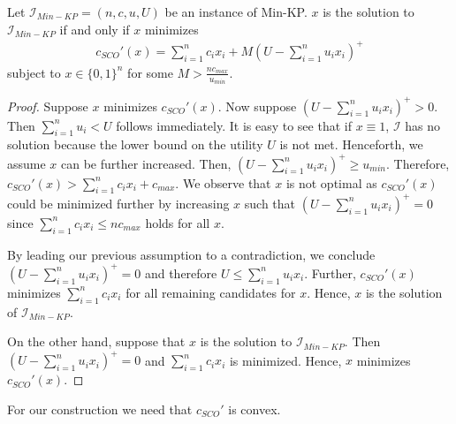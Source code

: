 \begin{lemma}
\label{lemma:integer_minimization}
Let $\mathcal{I}_{Min-KP} = (n, c, u, U)$ be an instance of Min-KP. $x$ is the solution to $\mathcal{I}_{Min-KP}$ if and only if $x$ minimizes \begin{align*}
    c_{SCO}'(x) = \sum_{i=1}^n c_i x_i + M(U - \sum_{i=1}^n u_i x_i)^+
\end{align*} subject to $x \in \{0,1\}^n$ for some $M > \frac{n c_{max}}{u_{min}}$.
\end{lemma}
\begin{proof}
Suppose $x$ minimizes $c_{SCO}'(x)$. Now suppose $(U - \sum_{i=1}^n u_i x_i)^+ > 0$. Then $\sum_{i=1}^n u_i < U$ follows immediately. It is easy to see that if $x \equiv 1$, $\mathcal{I}$ has no solution because the lower bound on the utility $U$ is not met. Henceforth, we assume $x$ can be further increased. Then, $(U - \sum_{i=1}^n u_i x_i)^+ \geq u_{min}$. Therefore, $c_{SCO}'(x) > \sum_{i=1}^n c_i x_i + c_{max}$. We observe that $x$ is not optimal as $c_{SCO}'(x)$ could be minimized further by increasing $x$ such that $(U - \sum_{i=1}^n u_i x_i)^+ = 0$ since $\sum_{i=1}^n c_i x_i \leq n c_{max}$ holds for all $x$.

By leading our previous assumption to a contradiction, we conclude $(U - \sum_{i=1}^n u_i x_i)^+ = 0$ and therefore $U \leq \sum_{i=1}^n u_i x_i$. Further, $c_{SCO}'(x)$ minimizes $\sum_{i=1}^n c_i x_i$ for all remaining candidates for $x$. Hence, $x$ is the solution of $\mathcal{I}_{Min-KP}$.

On the other hand, suppose that $x$ is the solution to $\mathcal{I}_{Min-KP}$. Then $(U - \sum_{i=1}^n u_i x_i)^+ = 0$ and $\sum_{i=1}^n c_i x_i$ is minimized. Hence, $x$ minimizes $c_{SCO}'(x)$.
\end{proof}

For our construction we need that $c_{SCO}'$ is convex.

